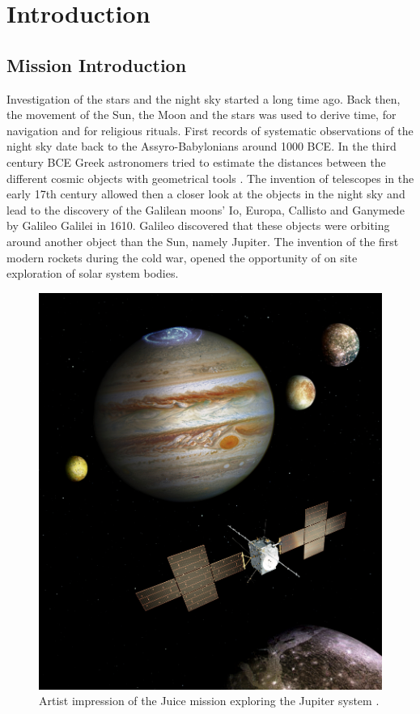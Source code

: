 \section{Introduction}
	
	\subsection{Mission Introduction} %
	
	Investigation of the stars and the night sky started a long time ago. Back then, the movement of the Sun, the Moon and the stars was used to derive time, for navigation and for religious rituals. First records of systematic observations of the night sky date back to the Assyro-Babylonians around 1000 BCE. In the third century BCE Greek astronomers tried to estimate the distances between the different cosmic objects with geometrical tools \cite{space_history}. The invention of telescopes in the early 17th century allowed then a closer look at the objects in the night sky and lead to the discovery of the Galilean moons' Io, Europa, Callisto and Ganymede by Galileo Galilei in 1610. Galileo discovered that these objects were orbiting around another object than the Sun, namely Jupiter. The invention of the first modern rockets during the cold war, opened the opportunity of on site exploration of solar system bodies.
	\begin{figure}
		\includegraphics[width=\linewidth]{Bilder/Juice_mission.jpg}
		\caption{Artist impression of the Juice mission exploring the Jupiter system \cite{JUICE_Pic}.}
		\label{fig:JUICE}
	\end{figure}

